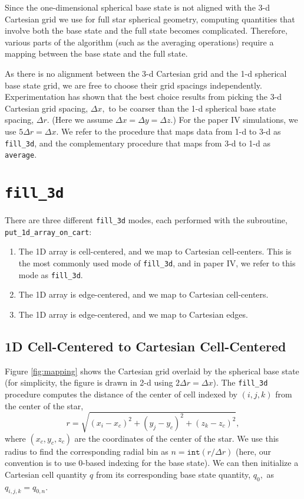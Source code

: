 Since the one-dimensional spherical base state is not aligned with the
3-d Cartesian grid we use for full star spherical geometry, computing quantities that
involve both the base state and the full state becomes complicated.
Therefore, various parts of the algorithm (such as the averaging operations)
require a mapping between the base state and the full state.

As there is no alignment between the 3-d Cartesian grid and the 1-d
spherical base state grid, we are free to choose their grid spacings
independently.  Experimentation has shown that the best choice results
from picking the 3-d Cartesian grid spacing, $\Delta x,$ to be coarser
than the 1-d spherical base state spacing, $\Delta r$.  (Here we
assume $\Delta x = \Delta y = \Delta z.$)  For the paper IV simulations,
we use $5 \Delta r = \Delta x$.  We refer to the procedure that maps data 
from 1-d to 3-d as {\tt fill\_3d}, and the
complementary procedure that maps from 3-d to 1-d as {\tt average}.
\section{\tt fill\_3d}
There are three different {\tt fill\_3d} modes, each performed with the
subroutine, {\tt put\_1d\_array\_on\_cart}:
\begin{enumerate}
\item The 1D array is cell-centered, and we map to Cartesian cell-centers.  
This is the most commonly used mode of {\tt fill\_3d}, and in paper IV, 
we refer to this mode as {\tt fill\_3d}.
\item The 1D array is edge-centered, and we map to Cartesian cell-centers.
\item The 1D array is edge-centered, and we map to Cartesian edges.  
\end{enumerate}
\subsection{1D Cell-Centered to Cartesian Cell-Centered}
\label{Sec:1D Cell-Centered to Cartesian Cell-Centered}

Figure  \ref{fig:mapping} shows the Cartesian grid overlaid by the 
spherical base state (for simplicity, the figure is drawn in 2-d 
using $2 \Delta r = \Delta x$).
The {\tt fill\_3d} procedure computes the distance of the center of
cell indexed by $(i,j,k)$ from the center of the star,
\begin{equation}
r = \sqrt{(x_i - x_c)^2 + (y_j - y_c)^2 + (z_k - z_c)^2},
\end{equation}
where $(x_c, y_c, z_c)$ are the coordinates of the center of the star.
We use this radius to find the corresponding radial bin as $n = \mathtt{int}(r
/ \Delta r)$ (here, our convention is to use 0-based indexing for the
base state).  We can then initialize a Cartesian cell quantity $q$ from its
corresponding base state quantity, $q_0,$ as $q_{i,j,k} = q_{0,n}$.

